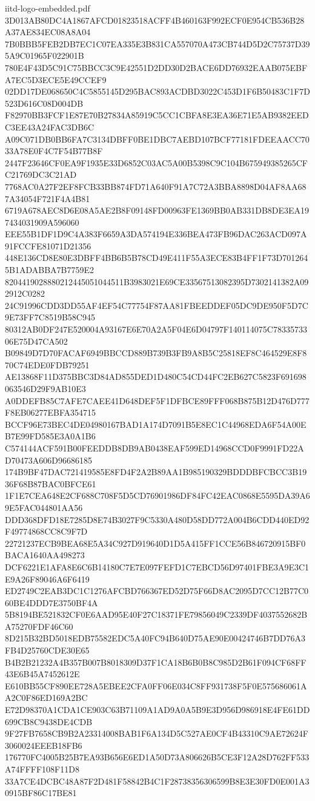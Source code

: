 \begin{filecontents*}[overwrite]{iitd-logo-embedded.pdf}
3D013AB80DC4A1867AFCD01823518ACFF4B460163F992ECF0E954CB536B28A37AE834EC08A8A04
7B0BBB5FEB2DB7EC1C07EA335E3B831CA557070A473CB744D5D2C75737D395A9C01965F022901B
780E4F43D5C91C75BBCC3C9E42551D2DD30D2BACE6DD76932EAAB075EBFA7EC5D3ECE5E49CCEF9
02DD17DE068650C4C5855145D295BAC893ACDBD3022C453D1F6B50483C1F7D523D616C08D004DB
F82970BB3FCF1E87E70B27834A85919C5CC1CBFA8E3EA36E71E5AB9382EEDC3EE43A24FAC3DB6C
A09C071DB0BB6FA7C3134DBFF0BE1DBC7AEBD107BCF77181FDEEAACC7033A78E0F4C7F54B77B8F
2447F23646CF0EA9F1935E33D6852C03AC5A00B5398C9C104B675949385265CFC21769DC3C21AD
7768AC0A27F2EF8FCB33BB874FD71A640F91A7C72A3BBA8898D04AF8AA687A34054F721F4A4B81
6719A678AEC8D6E08A5AE2B8F09148FD00963FE1369BB0AB331DB8DE3EA197434031909A596060
EEE55B1DF1D9C4A383F6659A3DA574194E336BEA473FB96DAC263ACD097A91FCCFE81071D21356
448E136CD8E80E3DBFF4BB6B5B78CD49E411F55A3ECE83B4FF1F73D7012645B1ADABBA7B7759E2
8204419028880212445051044511B3983021E69CE33567513082395D7302141382A092912C0282
24C91996CDD3DD55AF4EF54C77754F87AA81FBEEDDEF05DC9DE950F5D7C9E73FF7C8519B58C945
80312AB0DF247E520004A93167E6E70A2A5F04E6D04797F140114075C7833573306E75D47CA502
B09849D7D70FACAF6949BBCCD889B739B3FB9A8B5C25818EF8C464529E8F870C74EDE0FDB79251
AE13868F11D375BBC3D84AD855DED1D480C54CD44FC2EB627C5823F691698063546D29F9AB10E3
A0DDEFB85C7AFE7CAEE41D648DEF5F1DFBCE89FFF068B875B12D476D777F8EB06277EBFA354715
BCCF96E73BEC4DE04980167BAD1A174D7091B5E8EC1C44968EDA6F54A00EB7E99FD585E3A0A1B6
C574144ACF591B00FEEDDB8DB9AB0438EAF599ED14968CCD0F9991FD22AD70473A606D96686185
174B9BF47DAC721419585E8FD4F2A2B89AA1B985190329BDDDBFCBCC3B1936F68B87BAC0BFCE61
1F1E7CEA648E2CF688C708F5D5CD76901986DF84FC42EAC0868E5595DA39A69E5FAC044801AA56
DDD368DFD18E7285D8E74B3027F9C5330A480D58DD772A004B6CDD440ED92F49774868CC8C9F7D
22721237ECB9BEA68E5A34C927D919640D1D5A415FF1CCE56B846720915BF0BACA1640AA498273
DCF6221E1AFA8E6C6B14180C7E7E097FEFD1C7EBCD56D97401FBE3A9E3C1E9A26F89046A6F6419
ED2749C2EAB3DC1C1276AFCBD766367ED52D75F66D8AC2095D7CC12B77C060BE4DDD7E3750BF4A
5B8194BE521832CF0E6AAD95E40F27C18371FE79856049C2339DF4037552682BA75270FDF46C60
8D215B32BD5018EDB75582EDC5A40FC94B640D75AE90E00424746B7DD76A3FB4D25760CDE30E65
B4B2B21232A4B357B007B8018309D37F1CA18B6B0B8C985D2B61F094CF68FF43E6B45A7452612E
E610BB55CF890EE728A5EBEE2CFA0FF06E034C8FF931738F5F0E575686061AA2C0F86ED169A2BC
E72D98370A1CDA1CE903C63B71109A1AD9A0A5B9E3D956D986918E4FE61DD699CB8C9438DE4CDB
9F27FB7658CB9B2A23314008BAB1F6A134D5C527AE0CF4B43310C9AE72624F3060024EEEB18FB6
176770FC4005B25B7EA93B656E6ED1A50D73A806626B5CE3F12A28D762FF533A74FFFF108F11D8
33A7CE4DCBC48A87F2D481F58842B4C1F28738356306599B8E3E30FD0E001A30915BF86C17BE81

\end{filecontents*}
